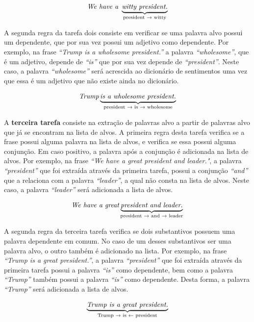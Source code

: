 \[\textit{We have a } \underbrace{\textit{witty president.}}_\text{president
\textrightarrow \text{ witty}}\]

A segunda regra da tarefa dois
consiste em verificar se uma palavra alvo possui um dependente, que por sua vez
possui um adjetivo como dependente. Por exemplo, na frase
\textit{``Trump is a wholesome president.''} a palavra \textit{``wholesome''}, que é um
adjetivo, depende de \textit{``is''} que por sua vez depende de
\textit{``president''}. Neste caso, a palavra \textit{``wholesome''}
será acrescida ao dicionário de sentimentos uma vez que essa é um adjetivo que
não existe ainda no dicionário.

\[\textit{Trump} \underbrace{\textit{is a wholesome president.}}_\text{president
\textrightarrow \text{ is} \textrightarrow \text{ wholesome}}\]

A \textbf{terceira tarefa} consiste na extração de palavras alvo a partir de
palavras alvo que já se encontram na lista de alvos. A primeira regra desta
tarefa verifica se a frase possui alguma palavra na lista de alvos, e verifica se essa possui alguma
conjunção. Em caso positivo, a palavra após a conjunção é adicionada na lista
de alvos. Por exemplo, na frase \textit{``We have a great president and
leader."}, a palavra \textit{``president''} que foi extraída através
da primeira tarefa, possui a conjunção \textit{``and''} que a relaciona com a
palavra \textit{``leader''}, a qual não consta na lista de alvos. Neste
caso, a palavra \textit{``leader''} será adicionada a lista de alvos.


\[\textit{We have a great} \underbrace{\textit{president and
leader.}}_\text{president \textrightarrow \text{ and} \textrightarrow \text{
leader}}\]

A segunda regra da terceira tarefa verifica se dois substantivos
possuem uma palavra dependente em comum. No caso de um desses substantivos ser
uma palavra alvo, o outro também é adicionado na lista. Por exemplo, na frase
\textit{``Trump is a great president.''}, a palavra \textit{``president''} que
foi extraída através da primeira tarefa possui a palavra \textit{``is''} como
dependente, bem como a palavra \textit{``Trump''} também possui a palavra
\textit{``is''} como dependente. Desta forma, a palavra \textit{``Trump''} será adicionada a
lista de alvos.

\[\underbrace{\textit{Trump is a great president.}}_\text{Trump
\textrightarrow \text{ is} \textleftarrow \text{ president}}\]



